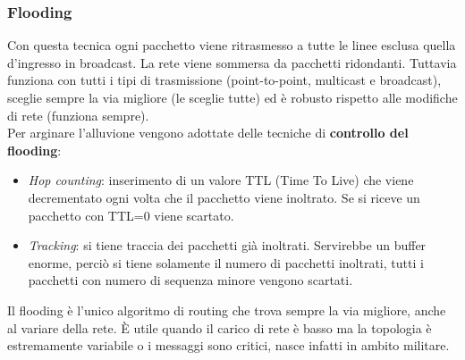 \documentclass[10pt,a4paper,twoside]{article}
\begin{document}
\subsubsection{Flooding}
Con questa tecnica ogni pacchetto viene ritrasmesso a tutte le linee esclusa quella d'ingresso in broadcast. La rete viene sommersa da pacchetti ridondanti. Tuttavia funziona con tutti i tipi di trasmissione (point-to-point, multicast e broadcast), sceglie sempre la via migliore (le sceglie tutte) ed è robusto rispetto alle modifiche di rete (funziona sempre).\\
Per arginare l'alluvione vengono adottate delle tecniche di \textbf{controllo del flooding}:
	\begin{itemize}
	\item \textit{Hop counting}: inserimento di un valore TTL (Time To Live) che viene decrementato ogni volta che il pacchetto viene inoltrato. Se si riceve un pacchetto con TTL=0 viene scartato.
	\item \textit{Tracking}: si tiene traccia dei pacchetti già inoltrati. Servirebbe un buffer enorme, perciò si tiene solamente il numero di pacchetti inoltrati, tutti i pacchetti con numero di sequenza minore vengono scartati.
	\end{itemize}
	Il flooding è l'unico algoritmo di routing che trova sempre la via migliore, anche al variare della rete. È utile quando il carico di rete è basso ma la topologia è estremamente variabile o i messaggi sono critici, nasce infatti in ambito militare.
\end{document}
